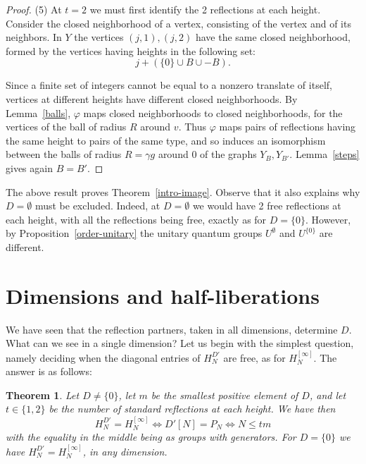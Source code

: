 \documentclass[11pt,a4paper]{article}
\newtheorem{thm}{Theorem}[section]
\begin{document}
\begin{proof}
(5) At $t=2$ we must first identify the 2 reflections at each height. Consider the closed neighborhood of a vertex, consisting of the vertex and of its neighbors. In $Y$ the vertices $(j,1),(j,2)$ have the same closed neighborhood, formed by the vertices having heights in the following set:
\[
 j+(\{0\}\cup B\cup-B).
\]

Since a finite set of integers cannot be equal to a nonzero translate of itself, vertices at different heights have different closed neighborhoods. By Lemma~\ref{balls}, $\varphi$ maps closed neighborhoods to closed neighborhoods, for the vertices of the ball of radius $R$ around $v$. Thus $\varphi$ maps pairs of reflections having the same height to pairs of the same type, and so induces an isomorphism between the balls of radius $R=\gamma g$ around $0$ of the graphs $Y_B,Y_{B'}$. Lemma~\ref{steps} gives again $B=B'$.
\end{proof}

The above result proves Theorem~\ref{intro-image}. Observe that it also explains why $D=\emptyset$ must be excluded. Indeed, at $D=\emptyset$ we would have 2 free reflections at each height, with all the reflections being free, exactly as for $D=\{0\}$. However, by Proposition~\ref{order-unitary} the unitary quantum groups $U^\emptyset$ and $U^{\{0\}}$ are different.

\section{Dimensions and half-liberations}\label{examples}

We have seen that the reflection partners, taken in all dimensions, determine $D$. What can we see in a single dimension? Let us begin with the simplest question, namely deciding when the diagonal entries of $H_N^{D'}$ are free, as for $H_N^{[\infty]}$. The answer is as follows:

\begin{thm}\label{dimension}
Let $D\neq\{0\}$, let $m$ be the smallest positive element of $D$, and let $t\in\{1,2\}$ be the number of standard reflections at each height. We have then
\[
 H_N^{D'}=H_N^{[\infty]}\iff D'[N]=P_N\iff N\leq tm
\]
with the equality in the middle being as groups with generators. For $D=\{0\}$ we have $H_N^{D'}=H_N^{[\infty]}$, in any dimension.
\end{thm}
\end{document}
